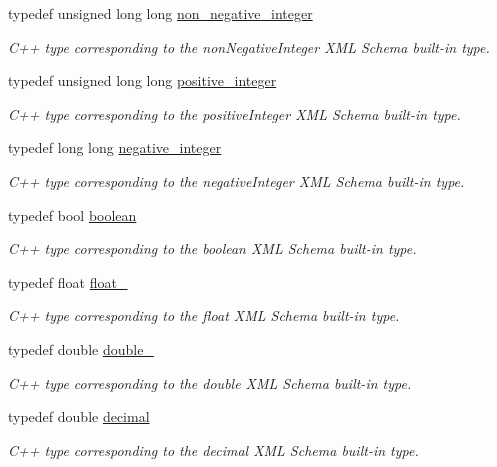 \begin{DoxyCompactItemize}
typedef unsigned long long \hyperlink{namespacexml__schema_af42ef5911d65f41a0a03598b056f05aa}{non\+\_\+negative\+\_\+integer}
\begin{DoxyCompactList}\small\item\em C++ type corresponding to the non\+Negative\+Integer X\+M\+L Schema built-\/in type. \end{DoxyCompactList}\item 
typedef unsigned long long \hyperlink{namespacexml__schema_abe9d639a15a121d2868ae2f9c974ca24}{positive\+\_\+integer}
\begin{DoxyCompactList}\small\item\em C++ type corresponding to the positive\+Integer X\+M\+L Schema built-\/in type. \end{DoxyCompactList}\item 
typedef long long \hyperlink{namespacexml__schema_acf9528a84381d07f2802785c947bf441}{negative\+\_\+integer}
\begin{DoxyCompactList}\small\item\em C++ type corresponding to the negative\+Integer X\+M\+L Schema built-\/in type. \end{DoxyCompactList}\item 
typedef bool \hyperlink{namespacexml__schema_ae5ada4ec9c54b51765c3e4c0e9631bba}{boolean}
\begin{DoxyCompactList}\small\item\em C++ type corresponding to the boolean X\+M\+L Schema built-\/in type. \end{DoxyCompactList}\item 
typedef float \hyperlink{namespacexml__schema_ad7e04ab17bba0b3fdde43fb79ef6ed87}{float\+\_\+}
\begin{DoxyCompactList}\small\item\em C++ type corresponding to the float X\+M\+L Schema built-\/in type. \end{DoxyCompactList}\item 
typedef double \hyperlink{namespacexml__schema_aac2d3d3483d3a20e8d96d2e8e5b3a470}{double\+\_\+}
\begin{DoxyCompactList}\small\item\em C++ type corresponding to the double X\+M\+L Schema built-\/in type. \end{DoxyCompactList}\item 
typedef double \hyperlink{namespacexml__schema_a69bfaf24f63a8c18ebd8e21db6b343df}{decimal}
\begin{DoxyCompactList}\small\item\em C++ type corresponding to the decimal X\+M\+L Schema built-\/in type. \end{DoxyCompactList}\item 

\end{DoxyCompactItemize}
